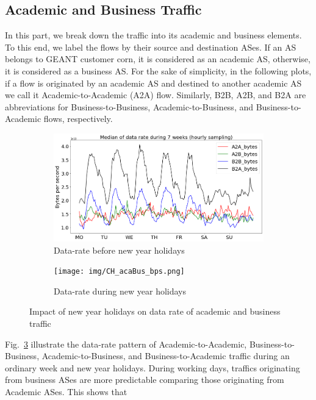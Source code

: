 \documentclass[10pt, journal, letterpaper]{IEEEtran}
\newcommand\linearFigSze{0.48}
\begin{document}
\subsection{Academic and Business Traffic}
In this part, we break down the traffic into its academic and business elements. To this end, we label the flows by their source and destination ASes. If an AS belongs to GEANT customer corn, it is considered as an academic AS, otherwise, it is considered as a business AS. For the sake of simplicity, in the following plots, if a flow is originated by an academic AS and destined to another academic AS we call it Academic-to-Academic (A2A) flow. Similarly, B2B, A2B, and B2A are abbreviations for Business-to-Business, Academic-to-Business, and Business-to-Academic flows, respectively.

\begin{figure}
    \begin{subfigure}{\linearFigSze\textwidth}
          \centering
          \includegraphics[width=\columnwidth]{img/BCH_acaBus_bps.png}
          \caption{Data-rate before new year holidays}
          \label{fig:BCH_acaBus_bps}
    \end{subfigure}
    \begin{subfigure}{\linearFigSze\textwidth}
          \centering
          \texttt{[image: img/CH\_acaBus\_bps.png]}
          \caption{Data-rate during new year holidays}
          \label{fig:CH_acaBus_bps}
    \end{subfigure}
    \caption{Impact of new year holidays on data rate of academic and business traffic}
    \label{fig:datarate_acaBus_BCH_CH}
\end{figure}
Fig.~\ref{fig:datarate_acaBus_BCH_CH} illustrate the data-rate pattern of Academic-to-Academic, Business-to-Business, Academic-to-Business, and Business-to-Academic traffic during an ordinary week and new year holidays. During working days, traffics originating from business ASes are more predictable comparing those originating from Academic ASes. This shows that 
\end{document}
